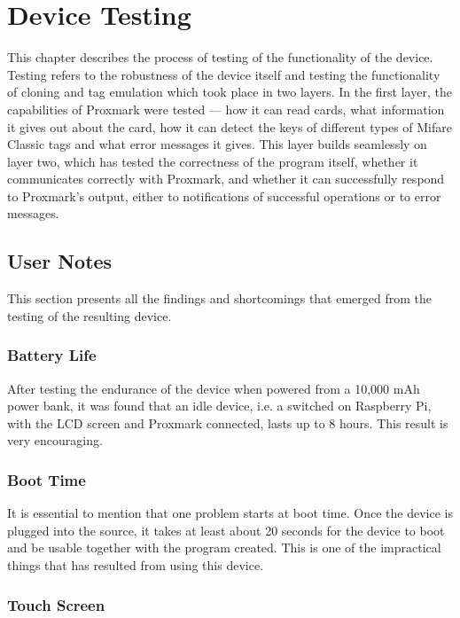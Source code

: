 \chapter{Device Testing}

This chapter describes the process of testing of the functionality of the device. Testing refers to the robustness of the device itself and testing the functionality of cloning and tag emulation which took place in two layers. In the first layer, the capabilities of Proxmark were tested --- how it can read cards, what information it gives out about the card, how it can detect the keys of different types of Mifare Classic tags and what error messages it gives. This layer builds seamlessly on layer two, which has tested the correctness of the program itself, whether it communicates correctly with Proxmark, and whether it can successfully respond to Proxmark's output, either to notifications of successful operations or to error messages. 


\section{User Notes}

This section presents all the findings and shortcomings that emerged from the testing of the resulting device.

\subsection{Battery Life}
After testing the endurance of the device when powered from a 10,000 mAh power bank, it was found that an idle device, i.e. a switched on Raspberry Pi, with the LCD screen and Proxmark connected, lasts up to 8 hours. This result is very encouraging.

\subsection{Boot Time}
It is essential to mention that one problem starts at boot time. Once the device is plugged into the source, it takes at least about 20 seconds for the device to boot and be usable together with the program created. This is one of the impractical things that has resulted from using this device.

\subsection{Touch Screen}

